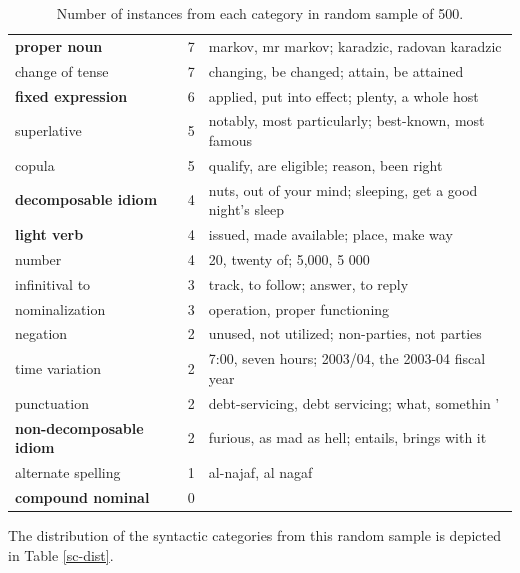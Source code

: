 \documentclass[11pt]{article}
\begin{document}
\begin{table}[h]
\begin{center}
\begin{tabular}{|l|r|l|}
\bf proper noun & 7 & markov, mr markov; karadzic, radovan karadzic\\
change of tense & 7 & changing, be changed; attain, be attained\\
\bf fixed expression & 6 & applied, put into effect; plenty, a whole host \\
superlative & 5 & notably, most particularly; best-known, most famous\\
copula & 5 & qualify, are eligible; reason, been right \\
\bf decomposable idiom & 4 & nuts, out of your mind; sleeping, get a good night's sleep\\
\bf light verb & 4  &  issued, made available; place, make way \\
number & 4 & 20, twenty of; 5,000, 5 000\\
infinitival to & 3 & track, to follow; answer, to reply \\
nominalization & 3 &  operation, proper functioning \\
negation & 2 & unused, not utilized; non-parties, not parties  \\
time variation & 2 & 7:00, seven hours; 2003/04, the 2003-04 fiscal year\\
punctuation & 2 & debt-servicing, debt servicing; what, somethin '\\
\bf non-decomposable idiom & 2 & furious, as mad as hell; entails, brings with it\\
alternate spelling & 1 & al-najaf, al nagaf\\
\bf compound nominal & 0 &\\
\hline
\end{tabular}
\end{center}
\caption{\label{font-table} Number of instances from each category in random sample of 500. }
\end{table}

The distribution of the syntactic categories from this random sample is depicted in Table \ref{sc-dist}. 
\end{document}
